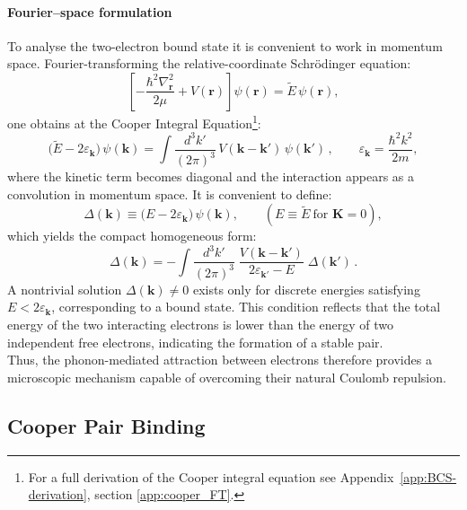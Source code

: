 \paragraph{Fourier–space formulation}
To analyse the two-electron bound state it is convenient to work in momentum space.  
Fourier-transforming the relative-coordinate Schr\"odinger equation:
\[
\left[-\frac{\hbar^2\nabla_{\mathbf r}^2}{2\mu}+V(\mathbf r)\right]\psi(\mathbf r)
=\tilde E\,\psi(\mathbf r),
\]
one obtains at the Cooper Integral Equation\footnote{For a full derivation of the Cooper integral equation see Appendix~\ref{app:BCS-derivation}, section \ref{app:cooper_FT}.}:
\begin{equation}
\boxed{
\bigl(\tilde E-2\varepsilon_{\mathbf k}\bigr)\,\psi(\mathbf k)
=\int\!\frac{d^3 k'}{(2\pi)^3}\, V(\mathbf k-\mathbf k')\,\psi(\mathbf k')}\,,
\qquad
\varepsilon_{\mathbf k}=\frac{\hbar^2 k^2}{2m},
\label{eq:cooper_integral_body}
\end{equation}
where the kinetic term becomes diagonal and the interaction appears as a convolution in momentum space.
It is convenient to define:
\[
\Delta(\mathbf k)\equiv \bigl(E-2\varepsilon_{\mathbf k}\bigr)\,\psi(\mathbf k),
\qquad (E\equiv \tilde E\ \text{for }\mathbf K=0),
\]
which yields the compact homogeneous form:
\begin{equation}
\boxed{
\Delta(\mathbf k) = -\!\int\!\frac{d^3 k'}{(2\pi)^3}\;
\frac{V(\mathbf k-\mathbf k')}{\,2\varepsilon_{\mathbf k'}-E\,}\;\Delta(\mathbf k') } \,.
\label{eq:cooper_Delta_body}
\end{equation}
A nontrivial solution $\Delta(\mathbf{k}) \neq 0$ exists only for discrete energies satisfying $E < 2\varepsilon_{\mathbf{k}}$, corresponding to a bound state.
This condition reflects that the total energy of the two interacting electrons is lower than the energy of two independent free electrons, indicating the formation of a stable pair.\\
Thus, the phonon-mediated attraction between electrons therefore provides a microscopic mechanism capable of overcoming their natural Coulomb repulsion.  

\subsection*{Cooper Pair Binding}

